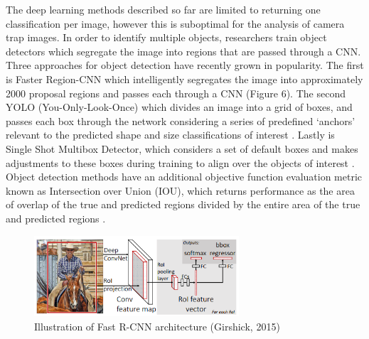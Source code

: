 \documentclass[11pt]{article}
\begin{document}
\noindent
The deep learning methods described so far are limited to returning one classification per image, however this is suboptimal for the analysis of camera trap images. In order to identify multiple objects, researchers train object detectors which segregate the image into regions that are passed through a CNN. Three approaches for object detection have recently grown in popularity. The first is Faster Region-CNN which intelligently segregates the image into approximately 2000 proposal regions and passes each through a CNN \cite{ren2017faster} (Figure 6). The second YOLO (You-Only-Look-Once) which divides an image into a grid of boxes, and passes each box through the network considering a series of predefined `anchors' relevant to the predicted shape and size classifications of interest \cite{redmon2016you}. Lastly is Single Shot Multibox Detector, which considers a set of default boxes and makes adjustments to these boxes during training to align over the objects of interest \cite{liu2016ssd}. Object detection methods have an additional objective function evaluation metric known as Intersection over Union (IOU), which returns performance as the area of overlap of the true and predicted regions divided by the entire area of the true and predicted regions \cite{nowozin2014optimal}. 
\newline

\begin{figure}
  \begin{flushright}
    \includegraphics[width=3in]{FastRCNN.png}
  \end{flushright}
  \caption{Illustration of Fast R-CNN architecture (Girshick, 2015)}
\end{figure}
\end{document}
